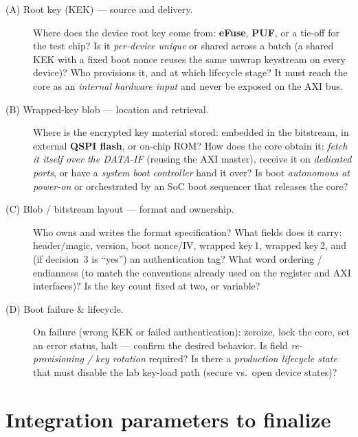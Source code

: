 \documentclass[11pt,a4paper]{article}
\begin{document}
\begin{description}

  \item[(A) Root key (KEK) --- source and delivery.]
    Where does the device root key come from: \textbf{eFuse}, \textbf{PUF}, or a tie-off for the
    test chip? Is it \emph{per-device unique} or shared across a batch (a shared KEK with a fixed
    boot nonce reuses the same unwrap keystream on every device)? Who provisions it, and at which
    lifecycle stage? It must reach the core as an \emph{internal hardware input} and never be
    exposed on the AXI bus.

  \item[(B) Wrapped-key blob --- location and retrieval.]
    Where is the encrypted key material stored: embedded in the bitstream, in external
    \textbf{QSPI flash}, or on-chip ROM? How does the core obtain it: \emph{fetch it itself over the
    DATA-IF} (reusing the AXI master), receive it on \emph{dedicated ports}, or have a \emph{system
    boot controller} hand it over? Is boot \emph{autonomous at power-on} or orchestrated by an SoC
    boot sequencer that releases the core?

  \item[(C) Blob / bitstream layout --- format and ownership.]
    Who owns and writes the format specification? What fields does it carry: header/magic, version,
    boot nonce/IV, wrapped key\,1, wrapped key\,2, and (if decision~3 is ``yes'') an authentication
    tag? What word ordering / endianness (to match the conventions already used on the register and
    AXI interfaces)? Is the key count fixed at two, or variable?

  \item[(D) Boot failure \& lifecycle.]
    On failure (wrong KEK or failed authentication): zeroize, lock the core, set an error status,
    halt --- confirm the desired behavior. Is field \emph{re-provisioning / key rotation} required?
    Is there a \emph{production lifecycle state} that must disable the lab key-load path (secure vs.\
    open device states)?

\end{description}

\section{Integration parameters to finalize}
\end{document}
